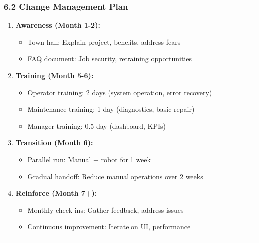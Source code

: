 \documentclass[
]{article}
\providecommand{\tightlist}{%
  \setlength{\itemsep}{0pt}\setlength{\parskip}{0pt}}
\begin{document}
\hypertarget{change-management-plan}{%
\subsubsection{6.2 Change Management
Plan}\label{change-management-plan}}

\begin{enumerate}
\def\labelenumi{\arabic{enumi}.}
\tightlist
\item
  \textbf{Awareness (Month 1-2):}

  \begin{itemize}
  \tightlist
  \item
    Town hall: Explain project, benefits, address fears
  \item
    FAQ document: Job security, retraining opportunities
  \end{itemize}
\item
  \textbf{Training (Month 5-6):}

  \begin{itemize}
  \tightlist
  \item
    Operator training: 2 days (system operation, error recovery)
  \item
    Maintenance training: 1 day (diagnostics, basic repair)
  \item
    Manager training: 0.5 day (dashboard, KPIs)
  \end{itemize}
\item
  \textbf{Transition (Month 6):}

  \begin{itemize}
  \tightlist
  \item
    Parallel run: Manual + robot for 1 week
  \item
    Gradual handoff: Reduce manual operations over 2 weeks
  \end{itemize}
\item
  \textbf{Reinforce (Month 7+):}

  \begin{itemize}
  \tightlist
  \item
    Monthly check-ins: Gather feedback, address issues
  \item
    Continuous improvement: Iterate on UI, performance
  \end{itemize}
\end{enumerate}

\begin{center}\rule{0.5\linewidth}{0.5pt}\end{center}
\end{document}
